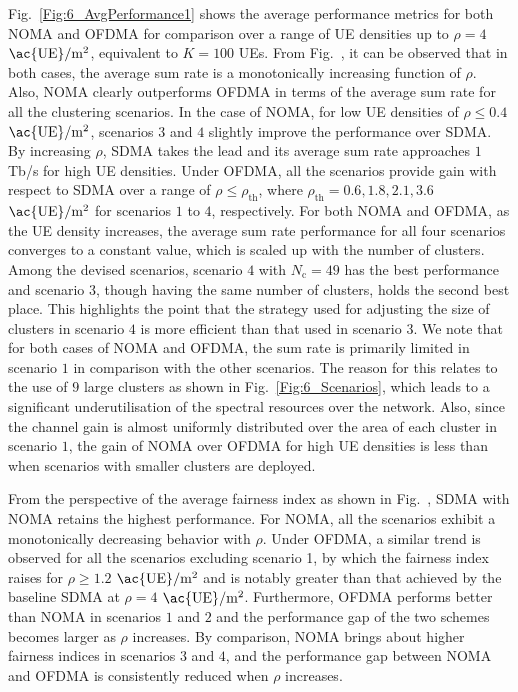 \documentclass[lettersize,journal]{IEEEtran}
\begin{document}
Fig.~\ref{Fig:6_AvgPerformance1} shows the average performance metrics for both \ac{NOMA} and \ac{OFDMA} for comparison over a range of \ac{UE} densities up to $\rho=4$ $\text{\ac{UE}}/\text{m}^2$, equivalent to $K=100$ \acp{UE}. From Fig.~, it can be observed that in both cases, the average sum rate is a monotonically increasing function of $\rho$. Also, \ac{NOMA} clearly outperforms \ac{OFDMA} in terms of the average sum rate for all the clustering scenarios. In the case of \ac{NOMA}, for low \ac{UE} densities of $\rho\leq0.4$ $\text{\ac{UE}}/\text{m}^2$, scenarios $3$ and $4$ slightly improve the performance over \ac{SDMA}. By increasing $\rho$, \ac{SDMA} takes the lead and its average sum rate approaches $1$ Tb/s for high \ac{UE} densities. Under \ac{OFDMA}, all the scenarios provide gain with respect to \ac{SDMA} over a range of $\rho\leq\rho_\mathrm{th}$, where $\rho_\mathrm{th}=0.6,1.8,2.1,3.6$ $\text{\ac{UE}}/\text{m}^2$ for scenarios $1$ to $4$, respectively. For both \ac{NOMA} and \ac{OFDMA}, as the \ac{UE} density increases, the average sum rate performance for all four scenarios converges to a constant value, which is scaled up with the number of clusters. Among the devised scenarios, scenario $4$ with $N_\mathrm{c}=49$ has the best performance and scenario $3$, though having the same number of clusters, holds the second best place. This highlights the point that the strategy used for adjusting the size of clusters in scenario $4$ is more efficient than that used in scenario $3$. We note that for both cases of \ac{NOMA} and \ac{OFDMA}, the sum rate is primarily limited in scenario $1$ in comparison with the other scenarios. The reason for this relates to the use of $9$ large clusters as shown in Fig.~\ref{Fig:6_Scenarios}, which leads to a significant underutilisation of the spectral resources over the network. Also, since the channel gain is almost uniformly distributed over the area of each cluster in scenario $1$, the gain of \ac{NOMA} over \ac{OFDMA} for high \ac{UE} densities is less than when scenarios with smaller clusters are deployed.

From the perspective of the average fairness index as shown in Fig.~, \ac{SDMA} with \ac{NOMA} retains the highest performance. For \ac{NOMA}, all the scenarios exhibit a monotonically decreasing behavior with $\rho$. Under \ac{OFDMA}, a similar trend is observed for all the scenarios excluding scenario 1, by which the fairness index raises for $\rho\geq1.2$ $\text{\ac{UE}}/\text{m}^2$ and is notably greater than that achieved by the baseline \ac{SDMA} at $\rho=4$ $\text{\ac{UE}}/\text{m}^2$. Furthermore, \ac{OFDMA} performs better than \ac{NOMA} in scenarios $1$ and $2$ and the performance gap of the two schemes becomes larger as $\rho$ increases. By comparison, \ac{NOMA} brings about higher fairness indices in scenarios $3$ and $4$, and the performance gap between \ac{NOMA} and \ac{OFDMA} is consistently reduced when $\rho$ increases.
\end{document}
